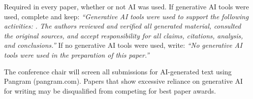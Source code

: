 \documentclass[10pt,letterpaper]{article}
\begin{document}
Required in every paper, whether or not AI was used. If generative AI tools were used,
complete and keep: \textit{``Generative AI tools were used to support the following
activities: \underline{\hspace{3cm}}. The authors reviewed and verified all generated
material, consulted the original sources, and accept responsibility for all claims,
citations, analysis, and conclusions.''} If no generative AI tools were used, write:
\textit{``No generative AI tools were used in the preparation of this paper.''}

The conference chair will screen all submissions for AI-generated text using Pangram
(pangram.com). Papers that show excessive reliance on generative AI for writing may be
disqualified from competing for best paper awards.

\printbibliography[heading=bibnumbered]
\end{document}

